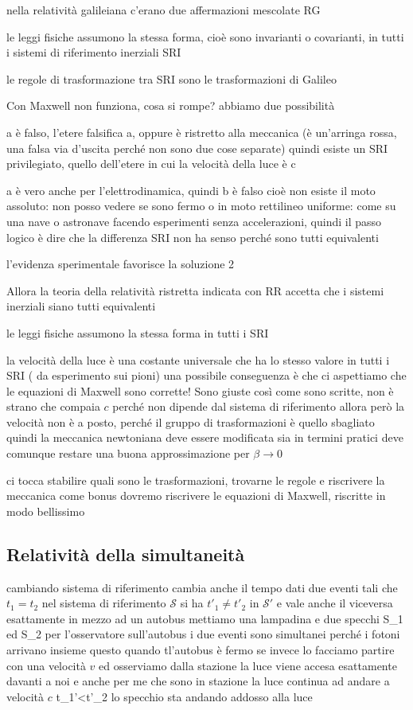 nella relatività galileiana c'erano due affermazioni mescolate
RG
	\item	 le leggi fisiche assumono la stessa forma, cioè sono invarianti o covarianti, in tutti i sistemi di riferimento inerziali SRI
	\item	 le regole di trasformazione tra SRI sono le trasformazioni di Galileo

Con Maxwell non funziona, cosa si rompe?
abbiamo due possibilità
	\item	a è falso, l'etere falsifica a, oppure è ristretto alla meccanica (è un'arringa rossa, una falsa via d'uscita perché non sono due cose separate)
	quindi esiste un SRI privilegiato, quello dell'etere in cui la velocità della luce è c
	\item	a è vero anche per l'elettrodinamica, quindi b è falso
	cioè non esiste il moto assoluto: non posso vedere se sono fermo o in moto rettilineo uniforme: come su una nave o astronave facendo esperimenti senza accelerazioni, quindi il passo logico è dire che la differenza SRI non ha senso perché sono tutti equivalenti
	
l'evidenza sperimentale favorisce la soluzione 2

Allora la teoria della relatività ristretta indicata con RR accetta che i sistemi inerziali siano tutti equivalenti
	\item	 le leggi fisiche assumono la stessa forma in tutti i SRI
	\item	la velocità della luce è una costante universale che ha lo stesso valore in tutti i SRI ( da esperimento sui pioni)
una possibile conseguenza è che ci aspettiamo che le equazioni di Maxwell sono corrette! Sono giuste così come sono scritte, non è strano che compaia $c$ perché non dipende dal sistema di riferimento
allora però la velocità non è a posto, perché il gruppo di trasformazioni è quello sbagliato
quindi la meccanica newtoniana deve essere modificata sia in termini pratici
deve comunque restare una buona approssimazione per $\beta\rightarrow 0$

ci tocca stabilire quali sono le trasformazioni, trovarne le regole e riscrivere la meccanica
come bonus dovremo riscrivere le equazioni di Maxwell, riscritte in modo bellissimo




\subsection{Relatività della simultaneità}
cambiando sistema di riferimento cambia anche il tempo
dati due eventi tali che $t_1=t_2$ nel sistema di riferimento $\mathcal{S}$ si ha $t'_1\neq t'_2$ in $\mathcal{S}'$ e vale anche il viceversa
esattamente in mezzo ad un autobus mettiamo una lampadina e due specchi S_1 ed S_2
per l'osservatore sull'autobus i due eventi sono simultanei perché i fotoni arrivano insieme
questo quando tl'autobus è fermo
se invece lo facciamo partire con una velocità $v$ ed osserviamo dalla stazione
la luce viene accesa esattamente davanti a noi e anche per me che sono in stazione la luce continua ad andare a velocità $c$
	t_1'<t'_2	lo specchio sta andando addosso alla luce
	
